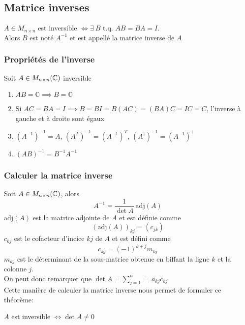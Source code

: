 \subsection{Matrice inverses}
\begin{definition}
    $A \in M_{n \times n}$ est inversible $\iff \exists \ B$ t.q. $AB = BA = I$. \\
    Alors $B$ est noté $A^{-1}$ et est appellé la matrice inverse de $A$
\end{definition}
\subsubsection{Propriétés de l'inverse}
Soit $A \in M_{n \times n}(\mathbb{C})$ inversible \begin{enumerate}
    \item $AB = \mathbb{O} \implies B = \mathbb{O}$
    \item Si $AC = BA = I \implies B = BI = B(AC) = (BA)C = IC = C $, l'inverse à gauche et à droite sont égaux
    \item $(A^{-1})^{-1} = A$, \quad $(A^T)^{-1} = (A^{-1})^{T}$, \quad $(A^\dagger)^{-1} = (A^{-1})^{\dagger}$
    \item $(AB)^{-1} = B^{-1}A^{-1}$
\end{enumerate}

\subsubsection{Calculer la matrice inverse}

Soit $A \in M_{n \times n}(\mathbb{C})$, alors
\[ A^{-1} = \frac{1}{\det A} \ \text{adj}(A) \]
$\text{adj}(A)$ est la matrice adjointe de $A$ et est définie comme
\[ \left(\text{adj}(A)\right)_{kj} = \left( c_{jk} \right) \]
$c_{kj}$ est le cofacteur d'incice $kj$ de $A$ et est défini comme
\[ c_{kj} = (-1)^{k + j}m_{kj} \]
$m_{kj}$ est le déterminant de la sous-matrice obtenue en biffant la ligne $k$ et la colonne $j$. \\
On peut donc remarquer que $\det A = \sum_{j = 1}^{n} = a_{kj} c_{kj}$ \\
Cette manière de calculer la matrice inverse nous permet de formuler ce théorème:
\begin{theorem}
    \label{inversible_small}
    $A$ est inversible $\iff \det A \neq 0$
\end{theorem}

